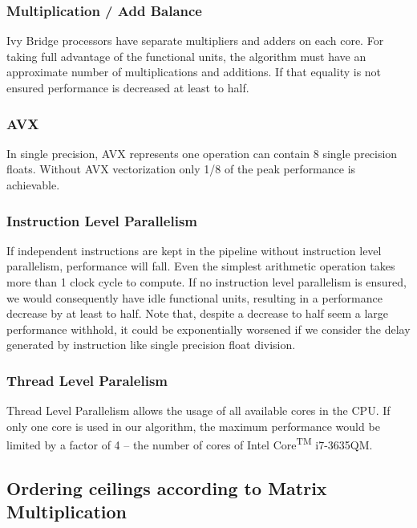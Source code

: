 \documentclass{sigplanconf}
\begin{document}
\subsubsection{Multiplication / Add Balance}
Ivy Bridge processors have separate multipliers and adders on each core. For taking full advantage of the functional units, the algorithm must have an approximate number of multiplications and additions. If that equality is not ensured performance is decreased at least to half.

\subsubsection{AVX}
In single precision, AVX represents one operation can contain 8 single precision floats. 
Without AVX vectorization only 1/8 of the peak performance is achievable.

\subsubsection{Instruction Level Parallelism}
If independent instructions are kept in the pipeline without instruction level parallelism, performance will fall. Even the simplest arithmetic operation takes more than 1 clock cycle to compute\cite{agner}. If no instruction level parallelism is ensured, we would consequently have idle functional units, resulting in a performance decrease by at least to half. Note that, despite a decrease to half seem a large performance withhold, it could be exponentially worsened if we consider the delay generated by instruction like single precision float division.

\subsubsection{Thread Level Paralelism}
Thread Level Parallelism allows the usage of all available cores in the CPU. If only one core is used in our algorithm, the maximum performance would be limited by a factor of 4 -- the number of cores of Intel\textsuperscript{\textregistered} Core\textsuperscript{TM} i7-3635QM.

\subsection{Ordering ceilings according to Matrix Multiplication}
\end{document}
